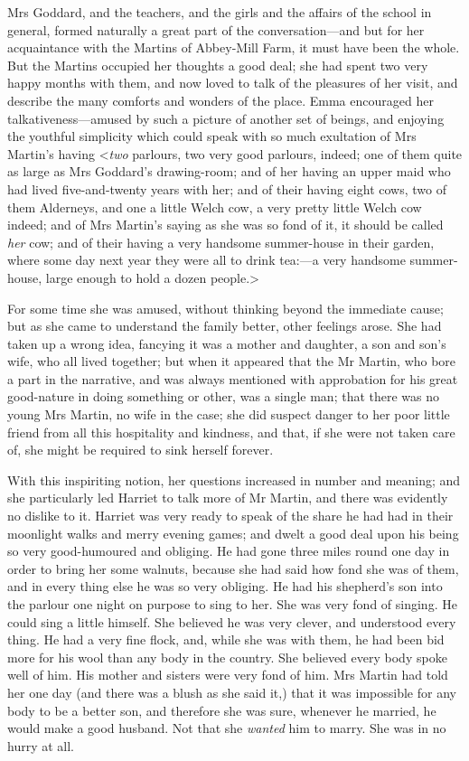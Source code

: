 Mrs Goddard, and the teachers, and the girls and the affairs of the school in general, formed naturally a great part of the conversation—and but for her acquaintance with the Martins of Abbey-Mill Farm, it must have been the whole. But the Martins occupied her thoughts a good deal; she had spent two very happy months with them, and now loved to talk of the pleasures of her visit, and describe the many comforts and wonders of the place. Emma encouraged her talkativeness—amused by such a picture of another set of beings, and enjoying the youthful simplicity which could speak with so much exultation of Mrs Martin's having <\textit{two} parlours, two very good parlours, indeed; one of them quite as large as Mrs Goddard's drawing-room; and of her having an upper maid who had lived five-and-twenty years with her; and of their having eight cows, two of them Alderneys, and one a little Welch cow, a very pretty little Welch cow indeed; and of Mrs Martin's saying as she was so fond of it, it should be called \textit{her} cow; and of their having a very handsome summer-house in their garden, where some day next year they were all to drink tea:—a very handsome summer-house, large enough to hold a dozen people.>

For some time she was amused, without thinking beyond the immediate cause; but as she came to understand the family better, other feelings arose. She had taken up a wrong idea, fancying it was a mother and daughter, a son and son's wife, who all lived together; but when it appeared that the Mr Martin, who bore a part in the narrative, and was always mentioned with approbation for his great good-nature in doing something or other, was a single man; that there was no young Mrs Martin, no wife in the case; she did suspect danger to her poor little friend from all this hospitality and kindness, and that, if she were not taken care of, she might be required to sink herself forever.

With this inspiriting notion, her questions increased in number and meaning; and she particularly led Harriet to talk more of Mr Martin, and there was evidently no dislike to it. Harriet was very ready to speak of the share he had had in their moonlight walks and merry evening games; and dwelt a good deal upon his being so very good-humoured and obliging. He had gone three miles round one day in order to bring her some walnuts, because she had said how fond she was of them, and in every thing else he was so very obliging. He had his shepherd's son into the parlour one night on purpose to sing to her. She was very fond of singing. He could sing a little himself. She believed he was very clever, and understood every thing. He had a very fine flock, and, while she was with them, he had been bid more for his wool than any body in the country. She believed every body spoke well of him. His mother and sisters were very fond of him. Mrs Martin had told her one day (and there was a blush as she said it,) that it was impossible for any body to be a better son, and therefore she was sure, whenever he married, he would make a good husband. Not that she \textit{wanted} him to marry. She was in no hurry at all.

